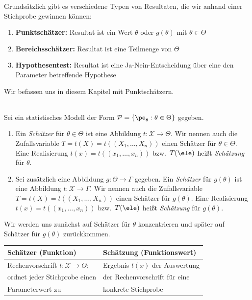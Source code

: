 Grundsätzlich gibt es verschiedene Typen von Resultaten, die wir anhand einer Stichprobe gewinnen können:
\begin{enumerate}
    \item \textbf{\gls{Punktschätzer}:} Resultat ist ein Wert $\theta$ oder $g(\theta)$ mit $\theta\in\Theta$
    \item \textbf{\gls{Bereichsschätzer}:} Resultat ist eine Teilmenge von $\Theta$
    \item \textbf{\gls{Hypothesentest}:} Resultat ist eine Ja-Nein-Entscheidung über eine den Parameter betreffende \gls{Hypothese}
\end{enumerate}
Wir befassen uns in diesem Kapitel mit \gls{Punktschätzer}n.

\begin{defi}  \\
    Sei ein statistisches Modell der Form $\mathcal P=\{\pe_{\theta}:\theta\in\Theta\}$ gegeben.
    \begin{enumerate}[label=(\alph*)]
        \item Ein \emph{\gls{Schätzer}} für $\theta\in\Theta$ ist eine Abbildung $t:\mathcal X\to\Theta$.
        Wir nennen auch die Zufallsvariable $T=t(X)=t((X_1,\dots,X_n))$ einen \gls{Schätzer} für $\theta\in\Theta$.
        Eine Realisierung $t(x)=t((x_1,\dots,x_n))$ bzw.\ $T(\ele)$ heißt \emph{Schätzung} für $\theta$.
        \item Sei zusätzlich eine Abbildung $g:\Theta\to\Gamma$ gegeben.
        Ein \emph{\gls{Schätzer}} für $g(\theta)$ ist eine Abbildung $t:\mathcal X\to\Gamma$.
        Wir nennen auch die Zufallsvariable $T=t(X)=t((X_1,\dots,X_n))$ einen \gls{Schätzer} für $g(\theta)$.
        Eine Realisierung $t(x)=t((x_1,\dots,x_n))$ bzw.\ $T(\ele)$ heißt \emph{Schätzung} für $g(\theta)$.
    \end{enumerate}
    Wir werden uns zunächst auf \gls{Schätzer} für $\theta$ konzentrieren und später auf \gls{Schätzer} für $g(\theta)$ zurückkommen.
\end{defi}

\begin{bem}
    \begin{mytable}
        \begin{tabular}{ll}
            \hline
            \textbf{\gls{Schätzer} (Funktion)} & \textbf{Schätzung (Funktionswert)} \\
            \hline
            Rechenvorschrift $t:\mathcal X\to\Theta$; & Ergebnis $t(x)$ der Auswertung \\
            ordnet jeder Stichprobe einen & der Rechenvorschrift für eine \\
            Parameterwert zu & konkrete Stichprobe \\
            \hline
        \end{tabular}
    \end{mytable}
\end{bem}


